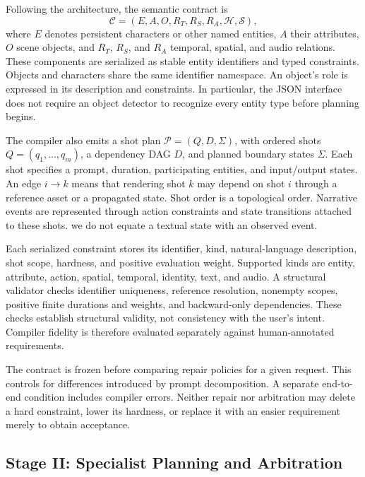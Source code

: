 Following the architecture, the semantic contract is
\begin{equation}
 \mathcal C=(E,A,O,R_T,R_S,R_A,\mathcal H,\mathcal S),
\end{equation}
where $E$ denotes persistent characters or other named entities, $A$ their
attributes, $O$ scene objects, and $R_T$, $R_S$, and $R_A$ temporal, spatial,
and audio relations. These components are serialized as stable entity
identifiers and typed constraints. Objects and characters share the same
identifier namespace. An object's role is expressed in its description and
constraints. In particular, the JSON interface does not require an object
detector to recognize every entity type before planning begins.

The compiler also emits a shot plan
$\mathcal P=(Q,D,\Sigma)$, with ordered shots
$Q=(q_1,\ldots,q_m)$, a dependency DAG $D$, and planned boundary states
$\Sigma$. Each shot specifies a prompt, duration, participating entities,
and input/output states. An edge $i\!\rightarrow\!k$ means that rendering
shot $k$ may depend on shot $i$ through a reference asset or a propagated
state. Shot order is a topological order. Narrative events are represented
through action constraints and state transitions attached to these shots.
we do not equate a textual state with an observed event.

Each serialized constraint stores its identifier, kind, natural-language
description, shot scope, hardness, and positive evaluation weight. Supported
kinds are entity, attribute, action, spatial, temporal, identity, text, and
audio. A structural validator checks identifier uniqueness, reference
resolution, nonempty scopes, positive finite durations and weights, and
backward-only dependencies. These checks establish structural validity,
not consistency with the user's intent. Compiler fidelity is therefore
evaluated separately against human-annotated requirements.

The contract is frozen before comparing repair policies for a given request.
This controls for differences introduced by prompt decomposition. A separate
end-to-end condition includes compiler errors. Neither repair nor arbitration
may delete a hard constraint, lower its hardness, or replace it with an easier
requirement merely to obtain acceptance.

\subsection{Stage II: Specialist Planning and Arbitration}
\label{sec:specialists}

